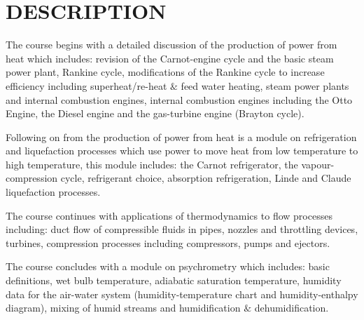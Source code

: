 \documentclass[12pts,a4paper,amsmath,amssymb,floatfix]{article}%
\begin{document}
\section{DESCRIPTION}
The course begins with a detailed discussion of the production of power from heat which includes: revision of the Carnot-engine cycle and the basic steam power plant, Rankine cycle, modifications of the Rankine cycle to increase efficiency including superheat/re-heat $\&$ feed water heating, steam power plants and internal combustion engines, internal combustion engines including the Otto Engine, the Diesel engine and the gas-turbine engine (Brayton cycle). 
\medskip

Following on from the production of power from heat is a module on refrigeration and liquefaction processes which use power to move heat from low temperature to high temperature, this module includes: the Carnot refrigerator, the vapour-compression cycle, refrigerant choice, absorption refrigeration, Linde and Claude liquefaction processes. 
\medskip

The course continues with applications of thermodynamics to flow processes including: duct flow of compressible fluids in pipes, nozzles and throttling devices, turbines, compression processes including compressors, pumps and ejectors. 
\medskip

The course concludes with a module on psychrometry which includes: basic definitions, wet bulb temperature, adiabatic saturation temperature, humidity data for the air-water system (humidity-temperature chart and humidity-enthalpy diagram), mixing of humid streams and humidification $\&$ dehumidification.


\end{document}
